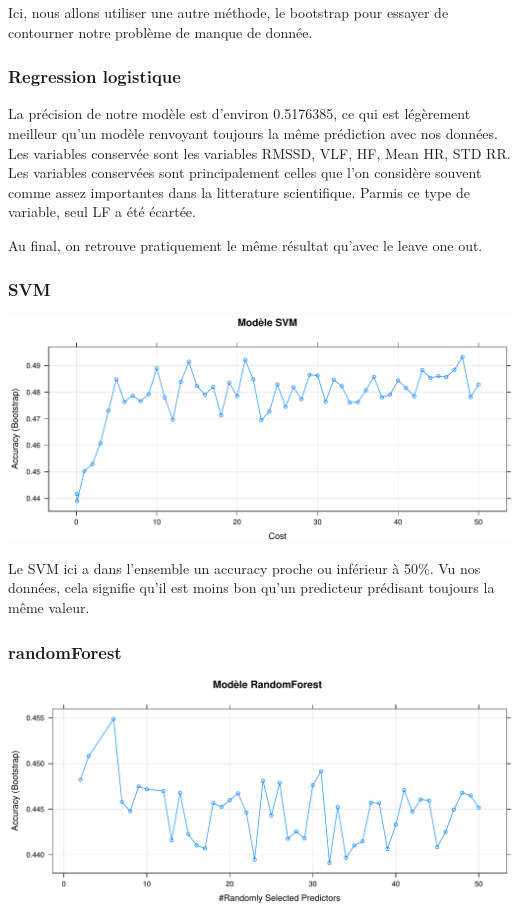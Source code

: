 \documentclass[]{article}
\begin{document}
Ici, nous allons utiliser une autre méthode, le bootstrap pour essayer
de contourner notre problème de manque de donnée.

\hypertarget{regression-logistique-2}{%
\subsubsection{Regression logistique}\label{regression-logistique-2}}

La précision de notre modèle est d'environ 0.5176385, ce qui est
légèrement meilleur qu'un modèle renvoyant toujours la même prédiction
avec nos données. Les variables conservée sont les variables RMSSD, VLF,
HF, Mean HR, STD RR. Les variables conservées sont principalement celles
que l'on considère souvent comme assez importantes dans la litterature
scientifique. Parmis ce type de variable, seul LF a été écartée.

Au final, on retrouve pratiquement le même résultat qu'avec le leave one
out.

\hypertarget{svm-2}{%
\subsubsection{SVM}\label{svm-2}}

\includegraphics{repport_projet_files/figure-latex/unnamed-chunk-55-1.pdf}

Le SVM ici a dans l'ensemble un accuracy proche ou inférieur à 50\%. Vu
nos données, cela signifie qu'il est moins bon qu'un predicteur
prédisant toujours la même valeur.

\hypertarget{randomforest-1}{%
\subsubsection{randomForest}\label{randomforest-1}}

\includegraphics{repport_projet_files/figure-latex/unnamed-chunk-56-1.pdf}
\end{document}

